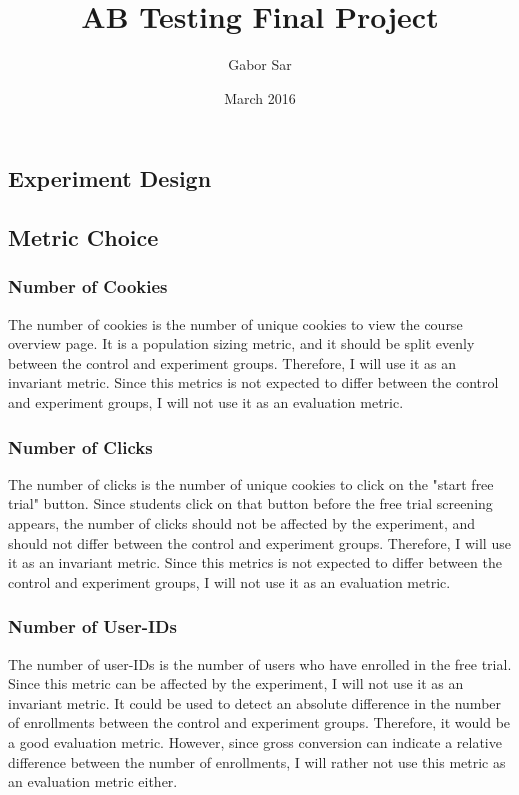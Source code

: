 \documentclass{article}
\title{AB Testing Final Project}
\author{Gabor Sar}
\date{March 2016}
\begin{document}
\maketitle

\begin{multicols}{2}

\section{Experiment Design}

\subsection{Metric Choice}

\subsubsection{Number of Cookies}

The number of cookies is the number of unique cookies to view the course overview page. It is a population sizing metric, and it should be split evenly between the control and experiment groups. Therefore, I will use it as an invariant metric. Since this metrics is not expected to differ between the control and experiment groups, I will not use it as an evaluation metric.

\subsubsection{Number of Clicks}

The number of clicks is the number of unique cookies to click on the "start free trial" button. Since students click on that button before the free trial screening appears, the number of clicks should not be affected by the experiment, and should not differ between the control and experiment groups. Therefore, I will use it as an invariant metric. Since this metrics is not expected to differ between the control and experiment groups, I will not use it as an evaluation metric.

\subsubsection{Number of User-IDs}

The number of user-IDs is the number of users who have enrolled in the free trial. Since this metric can be affected by the experiment, I will not use it as an invariant metric. It could be used to detect an absolute difference in the number of enrollments between the control and experiment groups. Therefore, it would be a good evaluation metric. However, since gross conversion can indicate a relative difference between the number of enrollments, I will rather not use this metric as an evaluation metric either.


\end{multicols}
\end{document}
